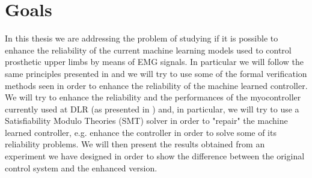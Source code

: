 \section{Goals}
In this thesis we are addressing the problem of studying if it is possible to enhance the reliability of the current machine learning models used to control prosthetic upper limbs by means of EMG signals. 
In particular we will follow the same principles presented in \cite{leofante2018automated} and we will try to use some of the formal verification methods seen in order to enhance the reliability of the machine learned controller. We will try to enhance the reliability and the performances of the myocontroller currently used at DLR (as presented in \cite{Strazzulla2017}) and, in particular, we will try to use a Satisfiability Modulo Theories (SMT) solver in order to "repair" the machine learned controller, e.g. enhance the controller in order to solve some of its reliability problems.
We will then present the results obtained from an experiment we have designed in order to show the difference between the original control system and the enhanced version.